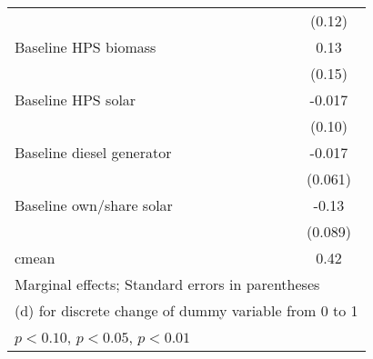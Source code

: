 \begin{table}[htbp]
\begin{tabular*}{1\hsize}{@{\hskip\tabcolsep\extracolsep\fill}l*{5}{c}}
                &                  &                  &                  &                  &   (0.12)         \\
Baseline HPS biomass&                  &                  &                  &                  &     0.13         \\
                &                  &                  &                  &                  &   (0.15)         \\
Baseline HPS solar&                  &                  &                  &                  &   -0.017         \\
                &                  &                  &                  &                  &   (0.10)         \\
Baseline diesel generator&                  &                  &                  &                  &   -0.017         \\
                &                  &                  &                  &                  &  (0.061)         \\
Baseline own/share solar&                  &                  &                  &                  &    -0.13         \\
                &                  &                  &                  &                  &  (0.089)         \\
\midrule
cmean           &                  &                  &                  &                  &     0.42         \\
\bottomrule
\multicolumn{6}{l}{\footnotesize Marginal effects; Standard errors in parentheses}\\
\multicolumn{6}{l}{\footnotesize  (d) for discrete change of dummy variable from 0 to 1}\\
\multicolumn{6}{l}{\footnotesize \sym{*} \(p<0.10\), \sym{**} \(p<0.05\), \sym{***} \(p<0.01\)}\\
\end{tabular*}
\end{table}
